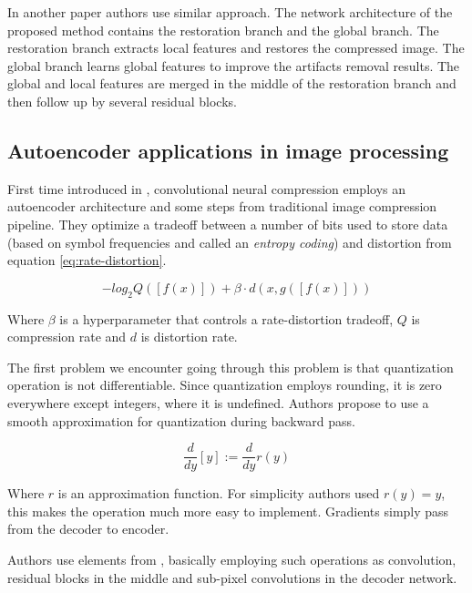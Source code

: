 In another paper \cite{li_learning_2020} authors use similar approach. The network architecture of the proposed method contains the restoration branch and the global branch. The restoration branch extracts local features and restores the compressed image. The global branch learns global features to improve the artifacts removal results. The global and local features are merged in the middle of the restoration branch and then follow up by several residual blocks.

\subsection{Autoencoder applications in image processing}

First time introduced in \cite{Toderici_Vincent_Johnston_Hwang_Minnen_Shor_Covell_2017}, convolutional neural compression employs an autoencoder architecture and some steps from traditional image compression pipeline. They optimize a tradeoff between a number of bits used to store data (based on symbol frequencies and called an \textit{entropy coding}) and distortion from equation \ref{eq:rate-distortion}.

\begin{equation}
    \label{eq:rate-distortion}
    − log_2 Q ([f (x)]) + \beta · d (x, g([f (x)]))
\end{equation}

Where $\beta$ is a hyperparameter that controls a rate-distortion tradeoff, $Q$ is compression rate and $d$ is distortion rate.

The first problem we encounter going through this problem is that quantization operation is not differentiable. Since quantization employs rounding, it is zero everywhere except integers, where it is undefined. Authors propose to use a smooth approximation for quantization during backward pass.

\begin{equation}
    \label{eq:quantization}
    \frac{d}{dy}[y]:=\frac{d}{dy}r(y)
\end{equation}

Where $r$ is an approximation function. For simplicity authors used $r(y)=y$, this makes the operation much more easy to implement. Gradients simply pass from the decoder to encoder.

Authors use elements from \cite{shi_real-time_2016}, basically employing such operations as convolution, residual blocks in the middle and sub-pixel convolutions in the decoder network.

